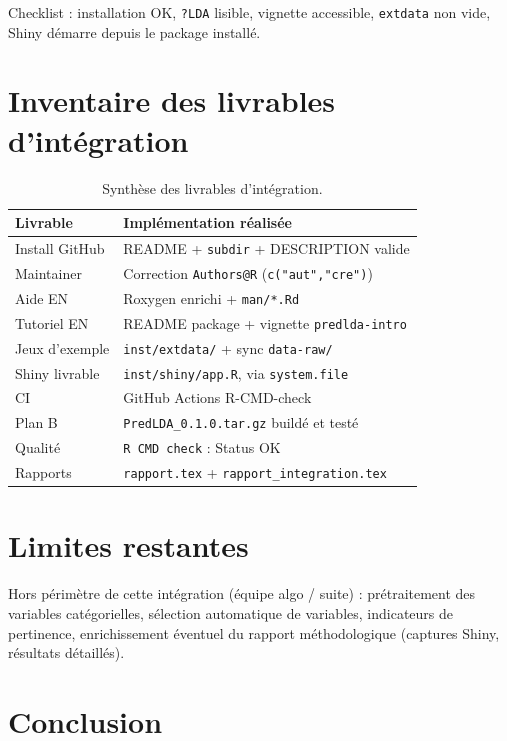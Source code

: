 \documentclass[11pt,a4paper]{article}
\begin{document}
Checklist : installation OK, \texttt{?LDA} lisible, vignette accessible,
\texttt{extdata} non vide, Shiny d\'emarre depuis le package install\'e.

\section{Inventaire des livrables d'int\'egration}

\begin{table}[ht]
\centering
\small
\begin{tabular}{@{}p{4.0cm}p{8.4cm}@{}}
\toprule
Livrable & Impl\'ementation r\'ealis\'ee \\
\midrule
Install GitHub & README + \texttt{subdir} + DESCRIPTION valide \\
Maintainer & Correction \texttt{Authors@R} (\texttt{c("aut","cre")}) \\
Aide EN & Roxygen enrichi + \texttt{man/*.Rd} \\
Tutoriel EN & README package + vignette \texttt{predlda-intro} \\
Jeux d'exemple & \texttt{inst/extdata/} + sync \texttt{data-raw/} \\
Shiny livrable & \texttt{inst/shiny/app.R}, via \texttt{system.file} \\
CI & GitHub Actions R-CMD-check \\
Plan B & \texttt{PredLDA\_0.1.0.tar.gz} build\'e et test\'e \\
Qualit\'e & \texttt{R CMD check} : Status OK \\
Rapports & \texttt{rapport.tex} + \texttt{rapport\_integration.tex} \\
\bottomrule
\end{tabular}
\caption{Synth\`ese des livrables d'int\'egration.}
\end{table}

\section{Limites restantes}

Hors p\'erim\`etre de cette int\'egration (\'equipe algo / suite) :
pr\'etraitement des variables cat\'egorielles, s\'election automatique de
variables, indicateurs de pertinence, enrichissement \'eventuel du rapport
m\'ethodologique (captures Shiny, r\'esultats d\'etaill\'es).

\section{Conclusion}
\end{document}
